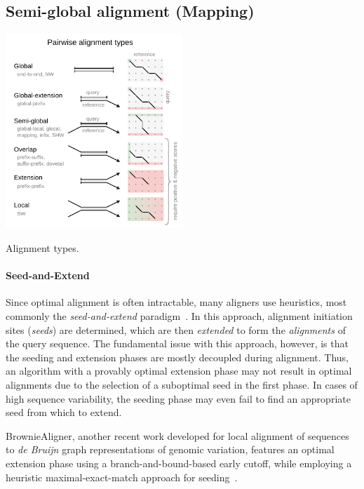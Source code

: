 \subsection{Semi-global alignment (Mapping)}

\begin{floatingfigure}[l]{0.5\textwidth}
    \includegraphics[width=0.5\textwidth]{alignment-types}
	\caption[Alignment types]{Alignment types.}
    \label{fig:alignment-types}
\end{floatingfigure}

\paragraph{Seed-and-Extend}
Since optimal alignment is often intractable, many aligners use heuristics, most
commonly the \emph{seed-and-extend}
paradigm~\cite{altschul_basic_1990,langmead_fast_2012,li_fast_2009}. In this
approach, alignment initiation sites (\emph{seeds}) are determined, which are
then \emph{extended} to form the \emph{alignments} of the query sequence. The
fundamental issue with this approach, however, is that the seeding and extension
phases are mostly decoupled during alignment. Thus, an algorithm with a provably
optimal extension phase may not result in optimal alignments due to the
selection of a suboptimal seed in the first phase. In cases of high sequence
variability, the seeding phase may even fail to find an appropriate seed from
which to extend.


BrownieAligner, another recent work developed for local alignment of sequences
to {\itshape de Bruijn} graph representations of genomic variation, features an
optimal extension phase using a branch-and-bound-based early cutoff, while
employing a heuristic maximal-exact-match approach for
seeding~\cite{heydari_browniealigner_2018}.